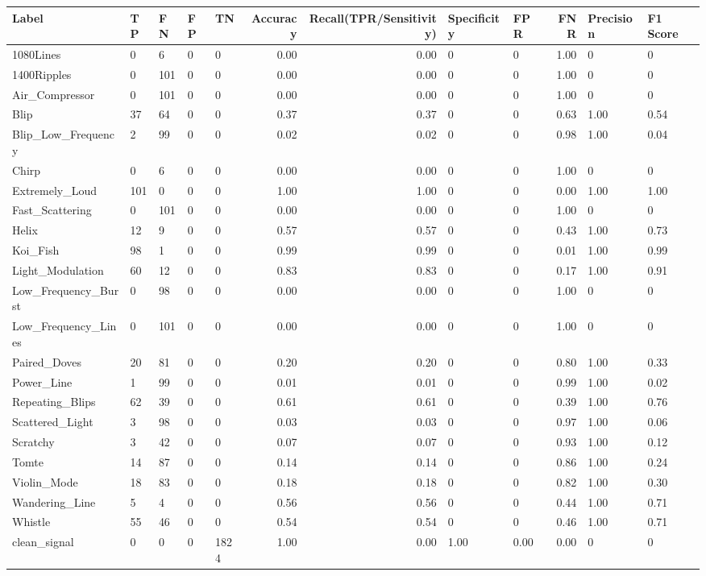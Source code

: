 \begin{tabular}{lllllrrllrll}
\toprule
Label & TP & FN & FP & TN & Accuracy & Recall(TPR/Sensitivity) & Specificity & FPR & FNR & Precision & F1 Score \\
\midrule
1080Lines & 0 & 6 & 0 & 0 & 0.00 & 0.00 & 0 & 0 & 1.00 & 0 & 0 \\
1400Ripples & 0 & 101 & 0 & 0 & 0.00 & 0.00 & 0 & 0 & 1.00 & 0 & 0 \\
Air_Compressor & 0 & 101 & 0 & 0 & 0.00 & 0.00 & 0 & 0 & 1.00 & 0 & 0 \\
Blip & 37 & 64 & 0 & 0 & 0.37 & 0.37 & 0 & 0 & 0.63 & 1.00 & 0.54 \\
Blip_Low_Frequency & 2 & 99 & 0 & 0 & 0.02 & 0.02 & 0 & 0 & 0.98 & 1.00 & 0.04 \\
Chirp & 0 & 6 & 0 & 0 & 0.00 & 0.00 & 0 & 0 & 1.00 & 0 & 0 \\
Extremely_Loud & 101 & 0 & 0 & 0 & 1.00 & 1.00 & 0 & 0 & 0.00 & 1.00 & 1.00 \\
Fast_Scattering & 0 & 101 & 0 & 0 & 0.00 & 0.00 & 0 & 0 & 1.00 & 0 & 0 \\
Helix & 12 & 9 & 0 & 0 & 0.57 & 0.57 & 0 & 0 & 0.43 & 1.00 & 0.73 \\
Koi_Fish & 98 & 1 & 0 & 0 & 0.99 & 0.99 & 0 & 0 & 0.01 & 1.00 & 0.99 \\
Light_Modulation & 60 & 12 & 0 & 0 & 0.83 & 0.83 & 0 & 0 & 0.17 & 1.00 & 0.91 \\
Low_Frequency_Burst & 0 & 98 & 0 & 0 & 0.00 & 0.00 & 0 & 0 & 1.00 & 0 & 0 \\
Low_Frequency_Lines & 0 & 101 & 0 & 0 & 0.00 & 0.00 & 0 & 0 & 1.00 & 0 & 0 \\
Paired_Doves & 20 & 81 & 0 & 0 & 0.20 & 0.20 & 0 & 0 & 0.80 & 1.00 & 0.33 \\
Power_Line & 1 & 99 & 0 & 0 & 0.01 & 0.01 & 0 & 0 & 0.99 & 1.00 & 0.02 \\
Repeating_Blips & 62 & 39 & 0 & 0 & 0.61 & 0.61 & 0 & 0 & 0.39 & 1.00 & 0.76 \\
Scattered_Light & 3 & 98 & 0 & 0 & 0.03 & 0.03 & 0 & 0 & 0.97 & 1.00 & 0.06 \\
Scratchy & 3 & 42 & 0 & 0 & 0.07 & 0.07 & 0 & 0 & 0.93 & 1.00 & 0.12 \\
Tomte & 14 & 87 & 0 & 0 & 0.14 & 0.14 & 0 & 0 & 0.86 & 1.00 & 0.24 \\
Violin_Mode & 18 & 83 & 0 & 0 & 0.18 & 0.18 & 0 & 0 & 0.82 & 1.00 & 0.30 \\
Wandering_Line & 5 & 4 & 0 & 0 & 0.56 & 0.56 & 0 & 0 & 0.44 & 1.00 & 0.71 \\
Whistle & 55 & 46 & 0 & 0 & 0.54 & 0.54 & 0 & 0 & 0.46 & 1.00 & 0.71 \\
clean_signal & 0 & 0 & 0 & 1824 & 1.00 & 0.00 & 1.00 & 0.00 & 0.00 & 0 & 0 \\
\bottomrule
\end{tabular}
